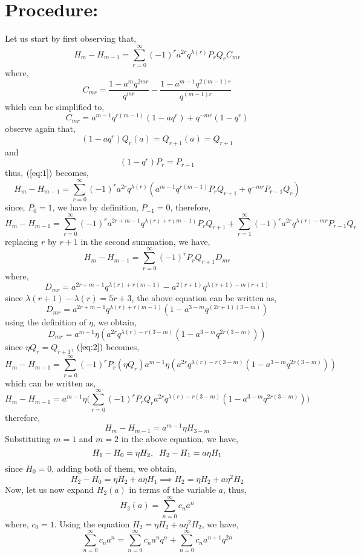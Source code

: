 \documentclass[12pt]{article}
\begin{document}
\section*{Procedure:}
Let us start by first observing that,
\begin{equation}  \label{eq:1}
H_m-H_{m-1}=\sum_{r=0}^{\infty}(-1)^ra^{2r}q^{\lambda(r)}P_rQ_rC_{mr}
\end{equation}
where,
$$C_{mr}=\frac{1-a^mq^{2mr}}{q^{mr}}-\frac{1-a^{m-1}q^{2(m-1)r}}{q^{(m-1)r}}$$
which can be simplified to,
$$C_{mr}=a^{m-1}q^{r(m-1)}(1-aq^r)+q^{-mr}(1-q^r)$$
observe again that,
$$(1-aq^r)Q_r(a)=Q_{r+1}(a)=Q_{r+1}$$
and 
$$(1-q^r)P_r=P_{r-1}$$
thus, $(\ref{eq:1})$ becomes,
$$H_m-H_{m-1}=\sum_{r=0}^{\infty}(-1)^ra^{2r}q^{\lambda(r)}(a^{m-1}q^{r(m-1)}P_rQ_{r+1}+q^{-mr}P_{r-1}Q_{r})$$
since, $P_0=1$, we have by definition, $P_{-1}=0$, therefore,
$$H_m-H_{m-1}=\sum_{r=0}^{\infty}(-1)^ra^{2r+m-1}q^{\lambda(r)+r(m-1)}P_rQ_{r+1}+\sum_{r=1}^{\infty}(-1)^ra^{2r}q^{\lambda(r)-mr}P_{r-1}Q_{r}$$
replacing $r$ by $r+1$ in the second summation, we have,
\begin{equation}  \label{eq:2}
H_m-H_{m-1}=\sum_{r=0}^{\infty}(-1)^rP_rQ_{r+1}D_{mr}
\end{equation}
where,
$$D_{mr}=a^{2r+m-1}q^{\lambda(r)+r(m-1)}-a^{2(r+1)}q^{\lambda(r+1)-m(r+1)}$$
since $\lambda(r+1)-\lambda(r)=5r+3$, the above equation can be written as,
$$D_{mr}=a^{2r+m-1}q^{\lambda(r)+r(m-1)}(1-a^{3-m}q^{(2r+1)(3-m)})$$
using the definition of $\eta$, we obtain,
$$D_{mr}=a^{m-1}\eta(a^{2r}q^{\lambda(r)-r(3-m)}(1-a^{3-m}q^{2r(3-m)}))$$
since $\eta Q_r=Q_{r+1}$, $(\ref{eq:2})$ becomes,
$$H_m-H_{m-1}=\sum_{r=0}^{\infty}(-1)^rP_r(\eta Q_r)a^{m-1}\eta(a^{2r}q^{\lambda(r)-r(3-m)}(1-a^{3-m}q^{2r(3-m)}))$$
which can be written as,
$$H_m-H_{m-1}=a^{m-1}\eta\Bigg(\sum_{r=0}^{\infty}(-1)^rP_r Q_ra^{2r}q^{\lambda(r)-r(3-m)}(1-a^{3-m}q^{2r(3-m)})\Bigg)$$
therefore,
$$H_m-H_{m-1}=a^{m-1}\eta H_{3-m}$$
Substituting $m=1$ and $m=2$ in the above equation, we have,
$$H_1-H_0=\eta H_2,\hspace{.2 cm}H_2-H_1=a\eta H_1$$
since $H_0=0$, adding both of them, we obtain,
$$H_2-H_0=\eta H_2+a\eta H_1\implies H_2=\eta H_2+a\eta^2 H_2$$
Now, let us now expand $H_2(a)$ in terms of the variable $a$, thus,
\begin{equation}  \label{eq:3}
H_2(a)=\sum_{n=0}^{\infty}c_na^n
\end{equation}
where, $c_0=1$. Using the equation $H_2=\eta H_2+a\eta^2 H_2$, we have,
$$\sum_{n=0}^{\infty}c_na^n=\sum_{n=0}^{\infty}c_na^nq^n+\sum_{n=0}^{\infty}c_na^{n+1}q^{2n}$$
\end{document}
